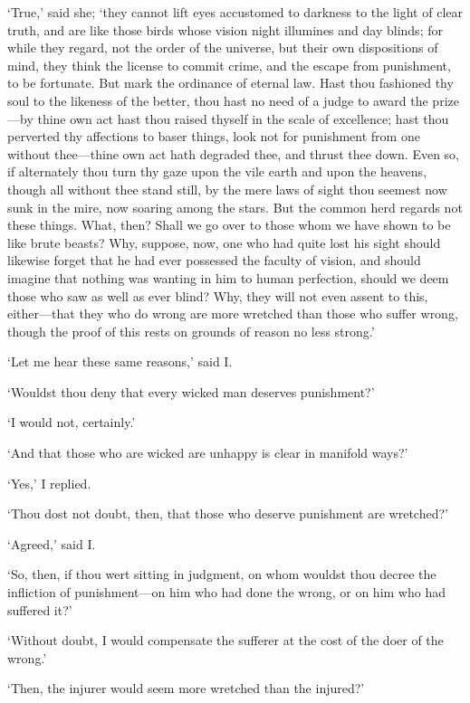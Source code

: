 \documentclass[11pt]{book}
\begin{document}
`True,' said she; `they cannot lift eyes accustomed to darkness to the
light of clear truth, and are like those birds whose vision night
illumines and day blinds; for while they regard, not the order of the
universe, but their own dispositions of mind, they think the license to
commit crime, and the escape from punishment, to be fortunate. But mark
the ordinance of eternal law. Hast thou fashioned thy soul to the
likeness of the better, thou hast no need of a judge to award the
prize---by thine own act hast thou raised thyself in the scale of
excellence; hast thou perverted thy affections to baser things, look not
for punishment from one without thee---thine own act hath degraded thee,
and thrust thee down. Even so, if alternately thou turn thy gaze upon
the vile earth and upon the heavens, though all without thee stand
still, by the mere laws of sight thou seemest now sunk in the mire, now
soaring among the stars. But the common herd regards not these things.
What, then? Shall we go over to those whom we have shown to be like
brute beasts? Why, suppose, now, one who had quite lost his sight
should likewise forget that he had ever possessed the faculty of vision,
and should imagine that nothing was wanting in him to human perfection,
should we \linebreak deem those who saw as well as ever blind? Why, they will not
even assent to this, either---that they who do wrong are more wretched
than those who suffer wrong, though the proof of this rests on grounds
of reason no less strong.'

`Let me hear these same reasons,' said I.

`Wouldst thou deny that every wicked man deserves punishment?'

`I would not, certainly.'

`And that those who are wicked are unhappy is clear in manifold ways?'

`Yes,' I replied.

`Thou dost not doubt, then, that those who deserve punishment are
wretched?'

`Agreed,' said I.

`So, then, if thou wert sitting in judgment, on whom wouldst thou decree
the infliction of punishment---on him who had done the wrong, or on him
who had suffered it?'

`Without doubt, I would compensate the sufferer at the cost of the doer
of the wrong.'

`Then, the injurer would seem more wretched than the injured?'
\end{document}
